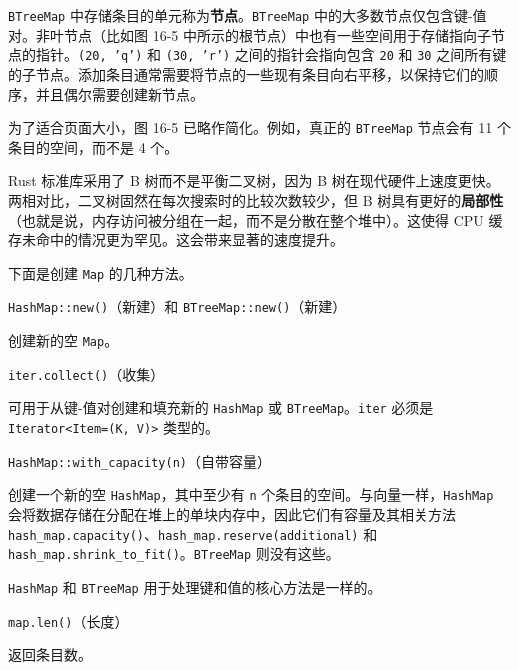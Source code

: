 \texttt{BTreeMap} 中存储条目的单元称为\textbf{节点}。\texttt{BTreeMap} 中的大多数节点仅包含键-值对。非叶节点（比如图 16-5 中所示的根节点）中也有一些空间用于存储指向子节点的指针。\texttt{(20, 'q')} 和 \texttt{(30, 'r')} 之间的指针会指向包含 \texttt{20} 和 \texttt{30} 之间所有键的子节点。添加条目通常需要将节点的一些现有条目向右平移，以保持它们的顺序，并且偶尔需要创建新节点。

为了适合页面大小，图 16-5 已略作简化。例如，真正的 \texttt{BTreeMap} 节点会有 11 个条目的空间，而不是 4 个。

Rust 标准库采用了 B 树而不是平衡二叉树，因为 B 树在现代硬件上速度更快。两相对比，二叉树固然在每次搜索时的比较次数较少，但 B 树具有更好的\textbf{局部性}（也就是说，内存访问被分组在一起，而不是分散在整个堆中）。这使得 CPU 缓存未命中的情况更为罕见。这会带来显著的速度提升。


下面是创建 \texttt{Map} 的几种方法。

\begin{myNote}
\texttt{HashMap::new()}（新建）和 \texttt{BTreeMap::new()}（新建）
\end{myNote}

创建新的空 \texttt{Map}。

\begin{mySidenote}
\texttt{iter.collect()}（收集）
\end{mySidenote}

可用于从键-值对创建和填充新的 \texttt{HashMap} 或 \texttt{BTreeMap}。\texttt{iter} 必须是 \texttt{Iterator<Item=(K, V)>} 类型的。

\begin{myNote}
\texttt{HashMap::with\_capacity(n)}（自带容量）
\end{myNote}

创建一个新的空 \texttt{HashMap}，其中至少有 \texttt{n} 个条目的空间。与向量一样，\texttt{HashMap} 会将数据存储在分配在堆上的单块内存中，因此它们有容量及其相关方法 \texttt{hash\_map.capacity()}、\texttt{hash\_map.reserve(additional)} 和 \texttt{hash\_map.shrink\_to\_fit()}。\texttt{BTreeMap} 则没有这些。

\texttt{HashMap} 和 \texttt{BTreeMap} 用于处理键和值的核心方法是一样的。

\begin{mySidenote}
\texttt{map.len()}（长度）
\end{mySidenote}

返回条目数。

